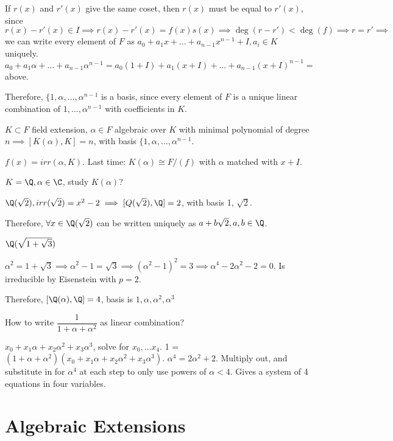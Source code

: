 \documentclass[twoside, 10pt]{article}
\begin{document}
If $r(x)$ and $r'(x)$ give the same coset, then $r(x)$ must be equal to $r'(x)$, since $r(x) - r'(x) \in I \implies r(x) - r'(x) = f(x)s(x) \implies \deg(r - r') < \deg(f) \implies r = r' \implies$ we can write every element of $F$ as $a_0 + a_1x + \ldots + a_{n-1}x^{n-1} + I, a_i \in K$ uniquely. $a_0 + a_1\alpha + \ldots + a_{n-1}\alpha^{n-1} = a_0(1 + I) + a_1(x + I) + \ldots + a_{n-1}(x + I)^{n-1} =$ above.

Therefore, $\{1, \alpha, \ldots, \alpha^{n-1}$ is a basis, since every element of $F$ is a unique linear combination of $1, \ldots, \alpha^{n-1}$ with coefficients in $K$.

\begin{cor}
    $K \subset F$ field extension, $\alpha \in F$ algebraic over $K$ with minimal polynomial of degree $n \implies[K(\alpha), K] = n$, with basis $\{1, \alpha, \ldots, \alpha^{n-1}$.
\end{cor}

$f(x) = irr(\alpha, K)$. Last time: $K(\alpha) \cong F/(f)$ with $\alpha$ matched with $x + I$.

\begin{exm*}
    $K = \Q, \alpha \in \C$, study $K(\alpha)$?
\end{exm*}
$\Q(\sqrt{2}), irr(\sqrt{2}) = x^2 - 2 \implies [Q(\sqrt{2}), \Q] = 2$, with basis 1, $\sqrt{2}$.

Therefore, $\forall x \in \Q(\sqrt{2})$ can be written uniquely as $a + b\sqrt{2}, a, b\in \Q$.

\begin{exm*}
    $\Q(\sqrt{1 + \sqrt{3}})$
\end{exm*}
$\alpha^2 = 1 + \sqrt{3} \implies \alpha^2 - 1 = \sqrt{3} \implies (\alpha^2 - 1)^2 = 3 \implies \alpha^4 - 2 \alpha^2 - 2 = 0$. Is irreducible by Eisenstein with $p = 2$.

Therefore, $[\Q(\alpha), \Q] = 4$, basis is $1, \alpha, \alpha^2, \alpha^3$

How to write $\dfrac{1}{1 + \alpha + \alpha^2}$ as linear combination?

$x_0 + x_1 \alpha + x_2 \alpha^2 + x_3 \alpha^3$, solve for $x_0,\ldots x_4$. 1 = $(1 + \alpha + \alpha^2)(x_0 + x_1 \alpha + x_2 \alpha^2 + x_3 \alpha^3)$. $\alpha^4 = 2\alpha^2 + 2$. Multiply out, and substitute in for $\alpha^4$ at each step to only use powers of $\alpha < 4$. Gives a system of 4 equations in four variables.

\section{Algebraic Extensions}
\end{document}
